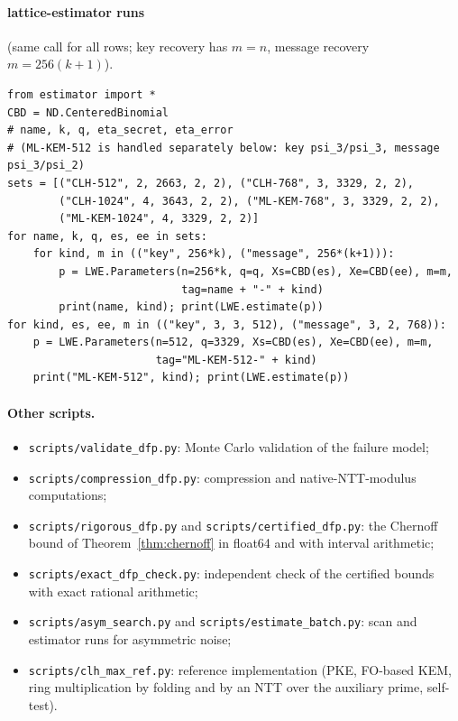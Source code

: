 \documentclass[11pt]{article}
\theoremstyle{remark}
\begin{document}
\paragraph{lattice-estimator runs} (same call for all rows; key recovery has $m=n$, message recovery $m=256(k+1)$).
\begin{verbatim}
from estimator import *
CBD = ND.CenteredBinomial
# name, k, q, eta_secret, eta_error
# (ML-KEM-512 is handled separately below: key psi_3/psi_3, message psi_3/psi_2)
sets = [("CLH-512", 2, 2663, 2, 2), ("CLH-768", 3, 3329, 2, 2),
        ("CLH-1024", 4, 3643, 2, 2), ("ML-KEM-768", 3, 3329, 2, 2),
        ("ML-KEM-1024", 4, 3329, 2, 2)]
for name, k, q, es, ee in sets:
    for kind, m in (("key", 256*k), ("message", 256*(k+1))):
        p = LWE.Parameters(n=256*k, q=q, Xs=CBD(es), Xe=CBD(ee), m=m,
                           tag=name + "-" + kind)
        print(name, kind); print(LWE.estimate(p))
for kind, es, ee, m in (("key", 3, 3, 512), ("message", 3, 2, 768)):
    p = LWE.Parameters(n=512, q=3329, Xs=CBD(es), Xe=CBD(ee), m=m,
                       tag="ML-KEM-512-" + kind)
    print("ML-KEM-512", kind); print(LWE.estimate(p))
\end{verbatim}

\paragraph{Other scripts.}
\begin{itemize}[nosep]
\item \texttt{scripts/validate\_dfp.py}: Monte Carlo validation of the failure model;
\item \texttt{scripts/compression\_\allowbreak dfp.py}: compression and native-NTT-modulus computations;
\item \texttt{scripts/rigorous\_dfp.py} and \texttt{scripts/certified\_dfp.py}: the Chernoff bound of Theorem~\ref{thm:chernoff} in float64 and with interval arithmetic;
\item \texttt{scripts/exact\_dfp\_check.py}: independent check of the certified bounds with exact rational arithmetic;
\item \texttt{scripts/asym\_search.py} and \texttt{scripts/estimate\_batch.py}: scan and estimator runs for asymmetric noise;
\item \texttt{scripts/clh\_max\_ref.py}: reference implementation (PKE, FO-based KEM, ring multiplication by folding and by an NTT over the auxiliary prime, self-test).
\end{itemize}
\end{document}
